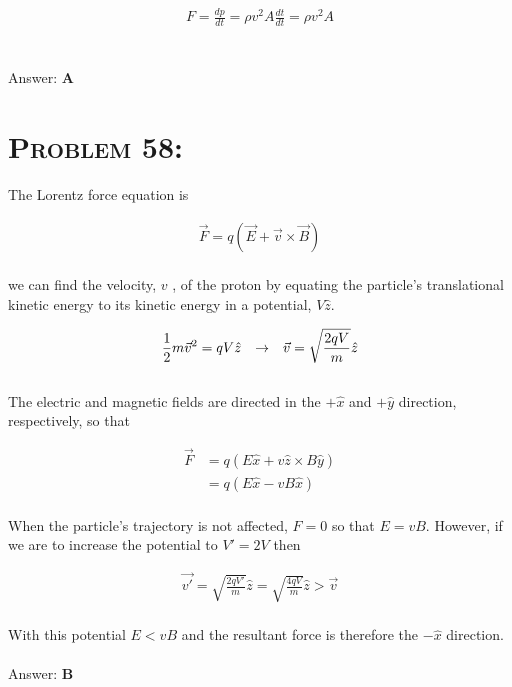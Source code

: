 \documentclass{article}
\begin{document}
\begin{gather}
F = \frac{d p}{d t} = \rho v^{2} A \frac{dt}{dt} =  \rho v^{2} A \nonumber
\end{gather}
\\\\
Answer: \textbf{\textcolor{ProcessBlue}A}\\


\section{\textsc{Problem 58:}} The Lorentz force equation is

\begin{gather}
\vec{F} = q (\vec{E} + \vec{v} \times \vec{B})
\end{gather}
\\
we can find the velocity, $v$ , of the proton by equating the particle's translational kinetic energy to its kinetic energy in a potential, $V \hat{z}$.

\begin{gather}
\frac{1}{2} m \vec{v}^{2} = q V \hat{z} \hspace{.1in} \rightarrow \hspace{.1in} \vec{v} = \sqrt{\frac{2qV}{m}}\hat{z}
\end{gather}
\\
The electric and magnetic fields are directed in the $+\hat{x}$ and $+\hat{y}$ direction, respectively, so that

\begin{align}
\vec{F} &= q (E\hat{x} + v\hat{z} \times B \hat{y}) \nonumber\\
&= q (E\hat{x} - vB\hat{x})
\end{align}
\\
When the particle's trajectory is not affected, $F = 0$ so that $E =vB$. However, if we are to increase the potential to $V' = 2V$ then

\begin{gather}
\vec{v'} = \sqrt{\frac{2qV'}{m}}\hat{z} = \sqrt{\frac{4qV}{m}}\hat{z} > \vec{v}
\end{gather}
\\
With this potential $E < vB$ and the resultant force is therefore the $\boxed{-\hat{x}}$ direction.
\\\\
Answer: \textbf{\textcolor{ProcessBlue}B}\\
\end{document}
